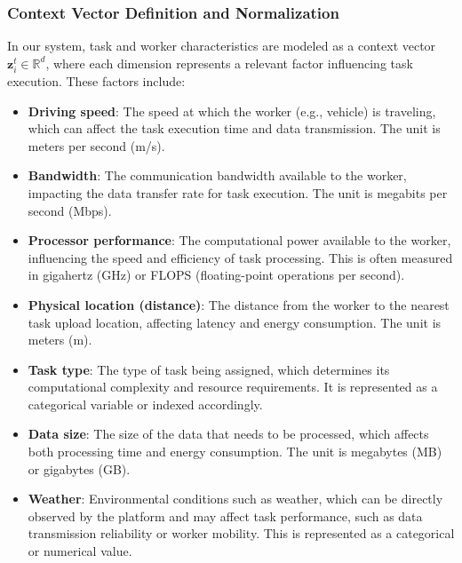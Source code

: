 \subsubsection{Context Vector Definition and Normalization}
In our system, task and worker characteristics are modeled as a context vector $\mathbf{z}_i^t \in \mathbb{R}^d$, where each dimension represents a relevant factor influencing task execution. These factors include:
\begin{itemize}
    \item \textbf{Driving speed}: The speed at which the worker (e.g., vehicle) is traveling, which can affect the task execution time and data transmission. The unit is meters per second (m/s).
    \item \textbf{Bandwidth}: The communication bandwidth available to the worker, impacting the data transfer rate for task execution. The unit is megabits per second (Mbps).
    \item \textbf{Processor performance}: The computational power available to the worker, influencing the speed and efficiency of task processing. This is often measured in gigahertz (GHz) or FLOPS (floating-point operations per second).
    \item \textbf{Physical location (distance)}: The distance from the worker to the nearest task upload location, affecting latency and energy consumption. The unit is meters (m).
    \item \textbf{Task type}: The type of task being assigned, which determines its computational complexity and resource requirements. It is represented as a categorical variable or indexed accordingly.
    \item \textbf{Data size}: The size of the data that needs to be processed, which affects both processing time and energy consumption. The unit is megabytes (MB) or gigabytes (GB).
    \item \textbf{Weather}: Environmental conditions such as weather, which can be directly observed by the platform and may affect task performance, such as data transmission reliability or worker mobility. This is represented as a categorical or numerical value.
\end{itemize}

